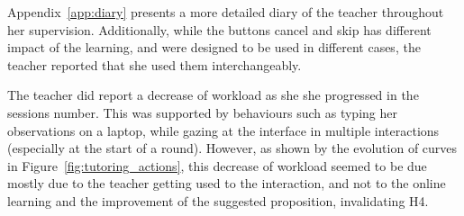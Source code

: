 Appendix~\ref{app:diary} presents a more detailed diary of the teacher throughout her supervision. Additionally, while the buttons cancel and skip has different impact of the learning, and were designed to be used in different cases, the teacher reported that she used them interchangeably.

The teacher did report a decrease of workload as she she progressed in the sessions number. This was supported by behaviours such as typing her observations on a laptop, while gazing at the interface in multiple interactions (especially at the start of a round). However, as shown by the evolution of curves in Figure~\ref{fig:tutoring_actions}, this decrease of workload seemed to be due mostly due to the teacher getting used to the interaction, and not to the online learning and the improvement of the suggested proposition, invalidating H4.

